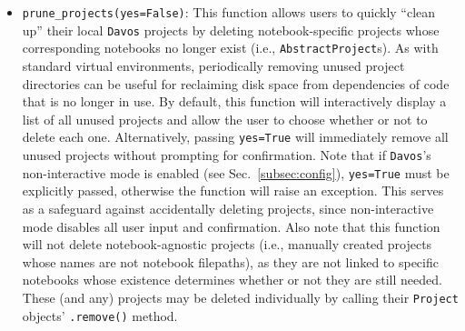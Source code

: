 \documentclass[preprint,12pt,a4paper]{elsarticle}
\begin{document}
\begin{itemize}
\item \texttt{prune\_projects(yes=False)}: This function allows users to quickly ``clean up'' their local \texttt{Davos} projects by deleting notebook-specific projects whose corresponding notebooks no longer exist (i.e., \texttt{AbstractProject}s).
  As with standard virtual environments, periodically removing unused project directories can be useful for reclaiming disk space from dependencies of code that is no longer in use.
  By default, this function will interactively display a list of all unused projects and allow the user to choose whether or not to delete each one.
  Alternatively, passing \texttt{yes=True} will immediately remove all unused projects without prompting for confirmation.
  Note that if \texttt{Davos}'s non-interactive mode is enabled (see Sec.~\ref{subsec:config}), \texttt{yes=True} must be explicitly passed, otherwise the function will raise an exception.
  This serves as a safeguard against accidentally deleting projects, since non-interactive mode disables all user input and confirmation.
  Also note that this function will not delete notebook-agnostic projects (i.e., manually created projects whose names are not notebook filepaths), as they are not linked to specific notebooks whose existence determines whether or not they are still needed.
  These (and any) projects may be deleted individually by calling their \texttt{Project} objects' \texttt{.remove()} method.


\end{itemize}
\end{document}
